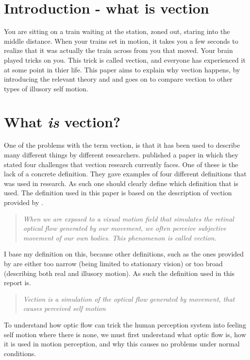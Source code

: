 \documentclass[11pt,a4paper,oneside,table,xcdraw]{article}
\begin{document}



\section{Introduction - what is vection}
You are sitting on a train waiting at the station, zoned out, staring into the middle distance. When your trains set in motion, it takes you a few seconds to realize that it was actually the train across from you that moved. Your brain played tricks on you. This trick is called vection, and everyone has experienced it at some point in thier life. This paper aims to explain why vection happens, by introducing the relevant theory and and goes on to compare vection to other types of illusory self motion. 
\section{What \textit{is} vection?}
One of the problems with the term vection, is that it has been used to describe many different things by different researchers. \cite{challenges} published a paper in which they stated four challenges that vection research currently faces. One of these is the lack of a concrete definition. They gave examples of four different definitions that was used in research. As such one should clearly define which definition that is used. The definition used in this paper is based on the description of vection provided by \cite{vection}.
\begin{quote}
\textit{When we are exposed to a visual motion field that simulates the retinal optical flow generated by our movement, we often perceive subjective movement of our own bodies. This phenomenon is called vection.}
\end{quote}
I base my definition on this, because other definitions, such as the ones provided by \cite{challenges} are either too narrow (being limited to stationary vision) or too broad (describing both real and illusory motion). As such the definition used in this report is.
\begin{quote}
\textit{Vection is a simulation of the optical flow generated by movement, that causes perceived self motion}
\end{quote}
To understand how optic flow can trick the human perception system into feeling self motion where there is none, we must first understand what optic flow is, how it is used in motion perception, and why this causes no problems under normal conditions.
\end{document}
